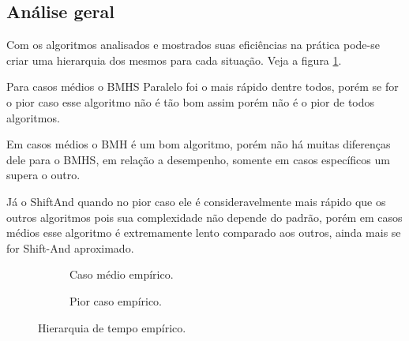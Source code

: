 \documentclass[11pt]{article}
\begin{document}
\subsection{Análise geral}
\label{sec:orgc039873}

Com os algoritmos analisados e mostrados suas eficiências na prática pode-se criar uma hierarquia dos mesmos para cada situação. Veja a figura \ref{fig:hierarquia}.

Para casos médios o BMHS Paralelo foi o mais rápido dentre todos, porém se for o pior caso esse algoritmo não é tão bom assim porém não é o pior de todos algoritmos.

Em casos médios o BMH é um bom algoritmo, porém não há muitas diferenças dele para o BMHS, em relação a desempenho, somente em casos específicos um supera o outro.

Já o ShiftAnd quando no pior caso ele é consideravelmente mais rápido que os outros algoritmos pois sua complexidade não depende do padrão, porém em casos médios esse algoritmo é extremamente lento comparado aos outros, ainda mais se for Shift-And aproximado.

\begin{center}
\begin{figure}
\begin{subfigure}[b]{.49\linewidth}
\centering
\caption{Caso médio empírico.}
\end{subfigure}
\begin{subfigure}[b]{.49\linewidth}
\centering
\caption{Pior caso empírico.}
\end{subfigure}
\caption{Hierarquia de tempo empírico.}\label{fig:hierarquia}
\end{figure}
\end{center}
\end{document}
